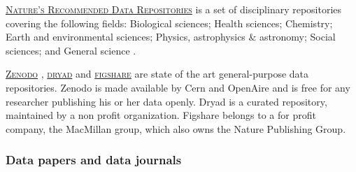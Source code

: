 \vspace{0.4cm}

\noindent {}  \textsc{\href{http://www.nature.com/sdata/data-policies/repositories}{Nature's Recommended Data Repositories}} is a set of disciplinary repositories covering the following fields: Biological sciences; Health sciences; Chemistry; Earth and environmental sciences; Physics, astrophysics \& astronomy; Social sciences; and General science \cite{nature_publishing_group_recommended_2014}.

\vspace{0.4cm}

\noindent {} \textsc{\href{http://zenodo.org}{Zenodo}} \cite{zenodo_zenodo_2015},  \textsc{\href{http://datadryad.org/}{dryad}} \cite{dryad_dryad_2015}  and  \textsc{\href{http://figshare.com/}{figshare}} \cite{figshare_figshare_2015} are state of the art general-purpose data repositories. Zenodo is made available by Cern and OpenAire and is free for any researcher publishing his or her data openly. Dryad is a curated repository, maintained by a non profit organization. Figshare belongs to a for profit company, the MacMillan group, which also owns the Nature Publishing Group.


\subsubsection{Data papers and data  journals}

